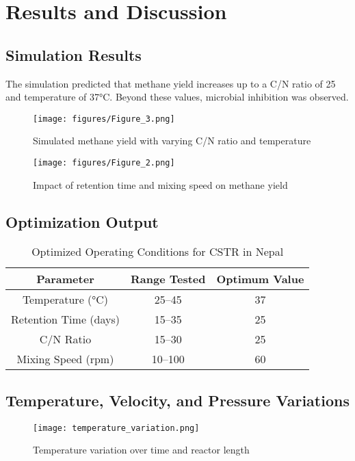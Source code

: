 \documentclass[12pt,a4paper]{article}
\begin{document}
\section{Results and Discussion}
\subsection{Simulation Results}
The simulation predicted that methane yield increases up to a C/N ratio of 25 and temperature of 37°C. Beyond these values, microbial inhibition was observed.

\begin{figure}[H]
\centering
\texttt{[image: figures/Figure\_3.png]}
\caption{Simulated methane yield with varying C/N ratio and temperature}
\label{fig:cn_temp}
\end{figure}

\begin{figure}[H]
\centering
\texttt{[image: figures/Figure\_2.png]}
\caption{Impact of retention time and mixing speed on methane yield}
\label{fig:retention_mixing}
\end{figure}

\subsection{Optimization Output}
\begin{table}[H]
\centering
\caption{Optimized Operating Conditions for CSTR in Nepal}
\begin{tabular}{|c|c|c|}
\hline
Parameter & Range Tested & Optimum Value \\
\hline
Temperature (°C) & 25--45 & 37 \\
Retention Time (days) & 15--35 & 25 \\
C/N Ratio & 15--30 & 25 \\
Mixing Speed (rpm) & 10--100 & 60 \\
\hline
\end{tabular}
\end{table}

\subsection{Temperature, Velocity, and Pressure Variations}
\begin{figure}[H]
\centering
\texttt{[image: temperature\_variation.png]}
\caption{Temperature variation over time and reactor length}
\label{fig:temp_var}
\end{figure}
\end{document}
